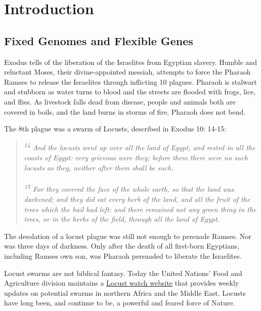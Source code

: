 \chapter{Introduction}  \label{Intro}

\section{Fixed Genomes and Flexible Genes}
  \label{Intro:sec:Fixed Genomes and Flexible Genes}

  Exodus tells of the liberation of the Israelites from Egyptian slavery. Humble and reluctant Moses, their divine-appointed messiah, attempts to force the Pharaoh Ramses to release the Israelites through inflicting 10 plagues. Pharaoh is stalwart and stubborn as water turns to blood and the streets are flooded with frogs, lice, and flies. As livestock falls dead from disease, people and animals both are covered in boils, and the land burns in storms of fire, Pharaoh does not bend.

  The 8th plague was a swarm of Locusts, described in Exodus 10: 14-15:

  \begin{quote}
    \itshape
    \singlespacing
    \textsuperscript{14} And the locusts went up over all the land of Egypt, and rested in all the coasts of Egypt: very grievous were they; before them there were no such locusts as they, neither after them shall be such.\\
      \\
    \textsuperscript{15} For they covered the face of the whole earth, so that the land was darkened; and they did eat every herb of the land, and all the fruit of the trees which the hail had left: and there remained not any green thing in the trees, or in the herbs of the field, through all the land of Egypt.
    \end{quote}

  The desolation of a locust plague was still not enough to persuade Ramses. Nor was three days of darkness. Only after the death of all first-born Egyptians, including Ramses own son, was Pharaoh persuaded to liberate the Israelites.

  Locust swarms are not biblical fantasy. Today the United Nations' Food and Agriculture division maintains a \href{http://www.fao.org/ag/locusts/en/info/info/news/index.html}{Locust watch website} that provides weekly updates on potential swarms in northern Africa and the Middle East. Locusts have long been, and continue to be, a powerful and feared force of Nature.

